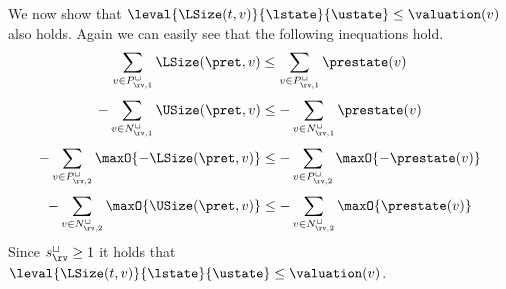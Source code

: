 We now show that $\leval{\LSize(t, v)}{\lstate}{\ustate} \leq \valuation(v)$ also holds.
Again we can easily see that the following inequations hold.
\[ \sum_{v \in P_{\rv,1}^\sqcup} \LSize(\pret, v) \leq \sum_{v \in P_{\rv,1}^\sqcup} \prestate(v) \]
\[ - \sum_{v \in N_{\rv,1}^\sqcup} \USize(\pret, v) \leq - \sum_{v \in N_{\rv,1}^\sqcup} \prestate(v) \]
\[ - \sum_{v \in P_{\rv,2}^\sqcup} \maxO{-\LSize(\pret, v)} \leq - \sum_{v \in P_{\rv,2}^\sqcup} \maxO{-\prestate(v)} \]
\[ - \sum_{v \in N_{\rv,2}^\sqcup} \maxO{\USize(\pret, v)} \leq - \sum_{v \in N_{\rv,2}^\sqcup} \maxO{\prestate(v)} \]
Since $s^\sqcup_\rv \geq 1$ it holds that $\leval{\LSize(t, v)}{\lstate}{\ustate} \leq \valuation(v)$.
